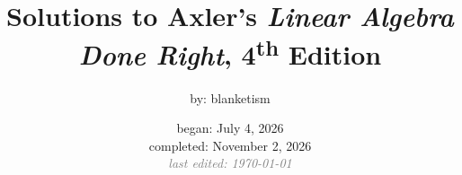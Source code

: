 \documentclass[axler]{blanketmanual}
\title{Solutions to Axler's \emph{Linear Algebra Done Right}, 4\textsuperscript{th} Edition}
\author{by: blanketism}
\date{began: July 4, 2026 \\ completed: November 2, 2026 \\ \textcolor{Gray}{\emph{last edited: \today}}}
\begin{document}
\maketitle

\hypertarget{clickabletoc}{}

\tableofcontents
























































\end{document}
